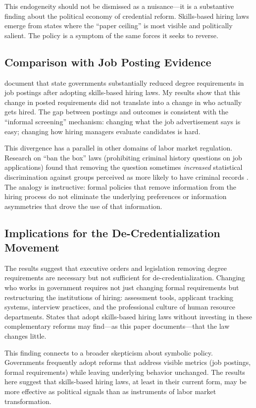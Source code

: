 \documentclass[12pt]{article}
\begin{document}
This endogeneity should not be dismissed as a nuisance---it is a substantive finding about the political economy of credential reform. Skills-based hiring laws emerge from states where the ``paper ceiling'' is most visible and politically salient. The policy is a symptom of the same forces it seeks to reverse.

\subsection{Comparison with Job Posting Evidence}

\citet{Blair2024} document that state governments substantially reduced degree requirements in job postings after adopting skills-based hiring laws. My results show that this change in posted requirements did not translate into a change in who actually gets hired. The gap between postings and outcomes is consistent with the ``informal screening'' mechanism: changing what the job advertisement says is easy; changing how hiring managers evaluate candidates is hard.

This divergence has a parallel in other domains of labor market regulation. Research on ``ban the box'' laws (prohibiting criminal history questions on job applications) found that removing the question sometimes \emph{increased} statistical discrimination against groups perceived as more likely to have criminal records \citep{AganStarr2018}. The analogy is instructive: formal policies that remove information from the hiring process do not eliminate the underlying preferences or information asymmetries that drove the use of that information.

\subsection{Implications for the De-Credentialization Movement}

The results suggest that executive orders and legislation removing degree requirements are necessary but not sufficient for de-credentialization. Changing who works in government requires not just changing formal requirements but restructuring the institutions of hiring: assessment tools, applicant tracking systems, interview practices, and the professional culture of human resource departments. States that adopt skills-based hiring laws without investing in these complementary reforms may find---as this paper documents---that the law changes little.

This finding connects to a broader skepticism about symbolic policy. Governments frequently adopt reforms that address visible metrics (job postings, formal requirements) while leaving underlying behavior unchanged. The results here suggest that skills-based hiring laws, at least in their current form, may be more effective as political signals than as instruments of labor market transformation.
\end{document}
